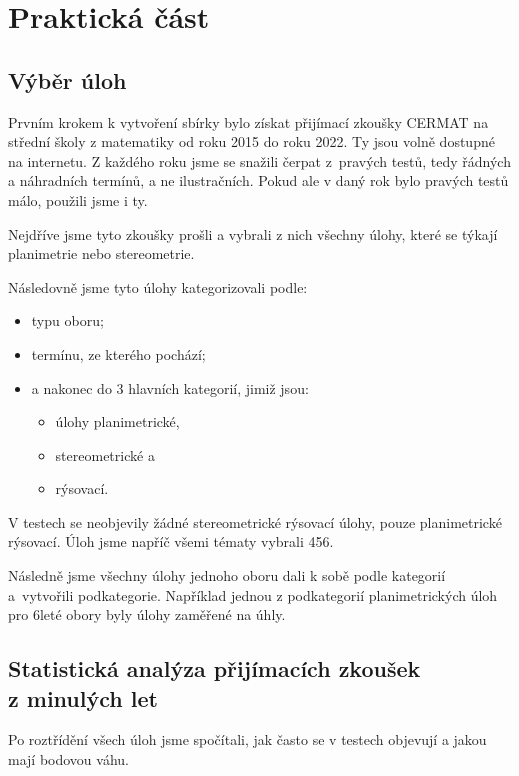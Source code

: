 \chapter{Praktická část}


\section{Výběr úloh}

Prvním krokem k vytvoření sbírky bylo získat přijímací zkoušky CERMAT na střední školy z matematiky od roku 2015 do roku 2022. Ty jsou volně dostupné na internetu. Z každého roku jsme se snažili čerpat z~pravých testů, tedy řádných a náhradních termínů, a ne ilustračních. Pokud ale v daný rok bylo pravých testů málo, použili jsme i ty.

Nejdříve jsme tyto zkoušky prošli a vybrali z nich všechny úlohy, které se týkají planimetrie nebo stereometrie.

Následovně jsme tyto úlohy kategorizovali podle:
\begin{itemize}
    \item typu oboru;
    \item termínu, ze kterého pochází;
    \item a nakonec do 3 hlavních kategorií, jimiž jsou:
    \begin{itemize}
        \item úlohy planimetrické,
        \item stereometrické a
        \item rýsovací.
    \end{itemize}
\end{itemize}

V testech se neobjevily žádné stereometrické rýsovací úlohy, pouze planimetrické rýsovací. Úloh jsme napříč všemi tématy vybrali 456.

Následně jsme všechny úlohy jednoho oboru dali k sobě podle kategorií a~vytvořili podkategorie. Například jednou z podkategorií planimetrických úloh pro 6leté obory byly úlohy zaměřené na úhly.


\section[Statistická analýza přijímacích zkoušek z minulých let]{Statistická analýza přijímacích zkoušek\\z minulých let}

Po roztřídění všech úloh jsme spočítali, jak často se v testech objevují a jakou mají bodovou váhu.

